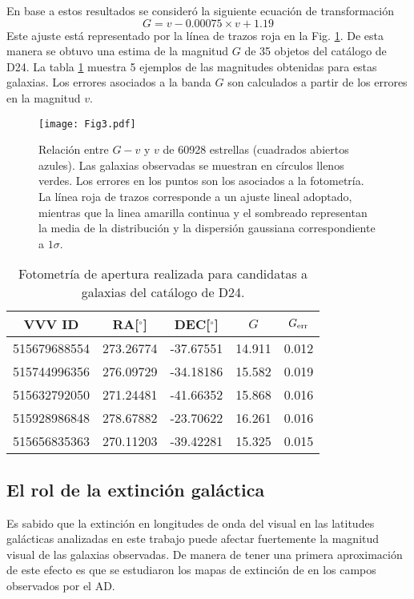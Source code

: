 \documentclass[baaa]{baaa}
\begin{document}
En base a estos resultados se consideró la siguiente ecuación de transformación $$G = v-0.00075\times v +1.19$$ 
Este ajuste está representado por la línea de trazos roja en la Fig. \ref{vG}. De esta manera se obtuvo una estima de la magnitud $G$ de 35 objetos del catálogo de D24. La tabla \ref{tbl_mags} muestra 5 ejemplos de las magnitudes obtenidas para estas galaxias. Los errores asociados a la banda $G$ son calculados a partir de los errores en la magnitud $v$.


\begin{figure}[!t]
\centering
\texttt{[image: Fig3.pdf]}
\caption{Relación entre $G-v$ y $v$ de 60928 estrellas (cuadrados abiertos azules). Las galaxias observadas se muestran en círculos llenos verdes. Los errores en los puntos son los asociados a la fotometría. La línea roja de trazos corresponde a un ajuste lineal adoptado, mientras que la linea amarilla continua y el sombreado representan la media de la distribución y la dispersión gaussiana correspondiente a $1\sigma$.}
\label{vG}
\end{figure}

\begin{table}[!t]
\centering
\caption{Fotometría de apertura realizada para candidatas a galaxias del catálogo de D24.}
\begin{tabular}{ccccc}
\hline\hline\noalign{\smallskip}
\!\!VVV ID & \!\!\!\!RA[$^{\circ}$] & \!\!\!\!DEC[$^{\circ}$] &\!\!\!\!$G$ & \!\!\!\!$G_{\rm{err}}$ \!\!\!\!\\
\hline\noalign{\smallskip}
515679688554 & 273.26774 & -37.67551 &  14.911 & 0.012\\
 515744996356 & 276.09729 & -34.18186 & 15.582 & 0.019\\
 515632792050 & 271.24481 & -41.66352 &  15.868 & 0.016\\
 515928986848 & 278.67882 & -23.70622 &  16.261 & 0.016\\
 515656835363 & 270.11203 & -39.42281 &  15.325 & 0.015\\
\hline
\end{tabular}
\label{tbl_mags}
\end{table}


\subsection{El rol de la extinción galáctica}
Es sabido que la extinción en longitudes de onda del visual en las latitudes galácticas analizadas en este trabajo puede afectar fuertemente la magnitud visual de las galaxias observadas. De manera de tener una primera aproximación de este efecto es que se estudiaron los mapas de extinción de \cite{schlafly2011} en los campos observados por el AD.
\end{document}
